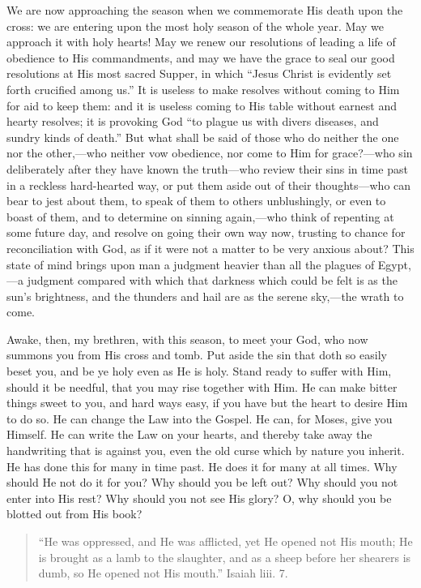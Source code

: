 We are now approaching the season when we commemorate His death
upon the cross: we are entering upon the most holy season of the whole
year. May we approach it with holy hearts! May we renew our
resolutions of leading a life of obedience to His commandments, and
may we have the grace to seal our good resolutions at His most sacred
Supper, in which ``Jesus Christ is evidently set forth crucified
among us.'' It is useless to make resolves without coming to Him
for aid to keep them: and it is useless coming to His table without
earnest and hearty resolves; it is provoking God ``to plague us
with divers diseases, and sundry kinds of death.'' But what shall
be said of those who do neither the one nor the other,—who neither
vow obedience, nor come to Him for grace?—who sin deliberately after
they have known the truth—who review their sins in time past in a
reckless hard-hearted way, or put them aside out of their thoughts—who
can bear to jest about them, to speak of them to others unblushingly,
or even to boast of them, and to determine on sinning again,—who
think of repenting at some future day, and resolve on going their own
way now, trusting to chance for reconciliation with God, as if it were
not a matter to be very anxious about? This state of mind brings upon
man a judgment heavier than all the plagues of Egypt,—a judgment
compared with which that darkness which could be felt is as the sun's
brightness, and the thunders and hail are as the serene sky,—the
wrath to come.

Awake, then, my brethren, with this season, to meet your God, who
now summons you from His cross and tomb. Put aside the sin that doth
so easily beset you, and be ye holy even as He is holy. Stand ready to
suffer with Him, should it be needful, that you may rise together with
Him. He can make bitter things sweet to you, and hard ways easy, if
you have but the heart to desire Him to do so. He can change the Law
into the Gospel. He can, for Moses, give you Himself. He can write the
Law on your hearts, and thereby take away the handwriting that is
against you, even the old curse which by nature you inherit. He has
done this for many in time past. He does it for many at all times.
Why
should He not do it for you? Why should you be left out? Why should
you not enter into His rest? Why should you not see His glory? O, why
should you be blotted out from His book?


\begin{quote}

``He was oppressed, and He was afflicted, yet He opened not
His mouth; He is brought as a lamb to the slaughter, and as a sheep
before her shearers is dumb, so He opened not His mouth.''
Isaiah liii. 7.

\end{quote}

